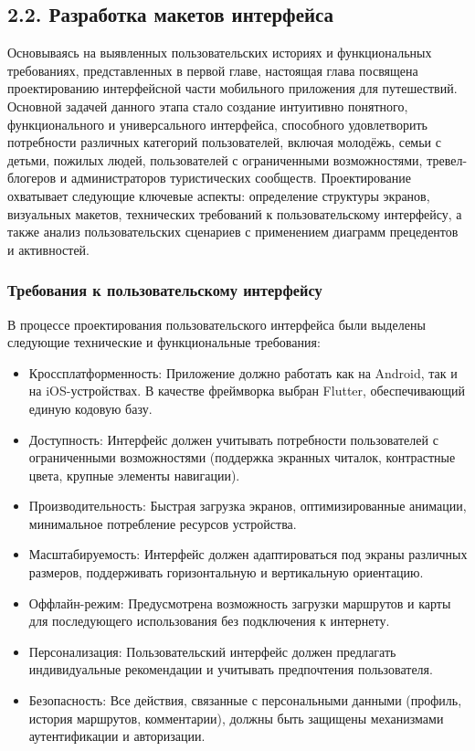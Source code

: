 \subsection*{2.2. Разработка макетов интерфейса}
Основываясь на выявленных пользовательских историях и функциональных требованиях, представленных в первой главе, настоящая глава посвящена проектированию интерфейсной части мобильного приложения для путешествий. Основной задачей данного этапа стало создание интуитивно понятного, функционального и универсального интерфейса, способного удовлетворить потребности различных категорий пользователей, включая молодёжь, семьи с детьми, пожилых людей, пользователей с ограниченными возможностями, тревел-блогеров и администраторов туристических сообществ.
Проектирование охватывает следующие ключевые аспекты: определение структуры экранов, визуальных макетов, технических требований к пользовательскому интерфейсу, а также анализ пользовательских сценариев с применением диаграмм прецедентов и активностей.

\subsubsection*{Требования к пользовательскому интерфейсу}
В процессе проектирования пользовательского интерфейса были выделены следующие технические и функциональные требования:
\begin{itemize}
    \item Кроссплатформенность: Приложение должно работать как на Android, так и на iOS-устройствах. В качестве фреймворка выбран Flutter, обеспечивающий единую кодовую базу.
    \item Доступность: Интерфейс должен учитывать потребности пользователей с ограниченными возможностями (поддержка экранных читалок, контрастные цвета, крупные элементы навигации).
    \item Производительность: Быстрая загрузка экранов, оптимизированные анимации, минимальное потребление ресурсов устройства.
    \item Масштабируемость: Интерфейс должен адаптироваться под экраны различных размеров, поддерживать горизонтальную и вертикальную ориентацию.
    \item Оффлайн-режим: Предусмотрена возможность загрузки маршрутов и карты для последующего использования без подключения к интернету.
    \item Персонализация: Пользовательский интерфейс должен предлагать индивидуальные рекомендации и учитывать предпочтения пользователя.
    \item Безопасность: Все действия, связанные с персональными данными (профиль, история маршрутов, комментарии), должны быть защищены механизмами аутентификации и авторизации.
\end{itemize}

